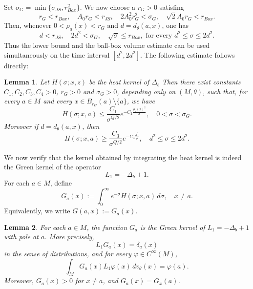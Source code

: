 \documentclass[11pt]{article}
\numberwithin{equation}{section}
\newtheorem{lemma}{Lemma}[section]
\numberwithin{equation}{section}
\begin{document}
	Set \(\sigma_G = \min\{\sigma_{JS}, r_{Box}^2\}\). We now choose a \(r_G > 0\) satisfing
	\[
	r_G < r_{Box}, \quad A_0 r_G < r_{JS}, \quad 2A_0^2 r_G^2 < \sigma_{G}, \quad \sqrt{2} A_0 r_G < r_{Box}.
	\]
	Then, whenever \(0<\rho_a(x)<r_G\) and \(d = d_\theta(a, x)\), one has
	\[
	d < r_{JS}, \quad 2d^2 <\sigma_{G}, \quad \sqrt{\sigma} \le r_{Box}, \text{ for every } d^2 \leq \sigma \leq 2d^2.
	\]
	Thus the lower bound and the ball-box volume estimate can be used simultaneously on the time interval \([d^2, 2d^2]\). The following estimate follows directly:
	\begin{lemma}\label{lemheatjl}
		Let \(H(\sigma ; x, z)\) be the heat kernel of \(\Delta_b\)  Then there exist constants \(C_1, C_2, C_3, C_4>0\), \(r_{G}>0\) and \(\sigma_{G}>0\), depending only on \((M, \theta)\), such that, for every \(a \in M\) and every \(x \in B_{r_G}(a) \setminus \{a\}\), we have
		\[
		H(\sigma ; x, a) \leq \frac{C_1}{\sigma^{Q/2}} e^{-C_2 \frac{\rho_a(x)^2}{\sigma}}, \quad 0<\sigma<\sigma_{G}.
		\]
		Moreover if \(d= d_\theta(a, x)\), then
		\[
		H(\sigma ; x, a) \ge \frac{C_3}{\sigma^{Q/2}} e^{-C_4 \frac{d^2}{\sigma}}, \quad d^2 \leq \sigma \leq 2d^2.
		\]
	\end{lemma}
	We now verify that the kernel obtained by integrating the heat kernel is indeed the Green kernel of the operator
	\[
	L_1=-\Delta_b+1.
	\]
	For each \(a\in M\), define
	\[
	G_a(x) := \int_0^\infty e^{-\sigma}H(\sigma;x,a)\,d\sigma, \quad x\ne a.
	\]
	Equivalently, we write \(G(a,x):=G_a(x)\).
	\begin{lemma}\label{lemgreen}
		For each \(a\in M\), the function \(G_a\) is the Green kernel of \(L_1=-\Delta_b+1\) with pole at \(a\).  More precisely,
		\[
		L_{1}G_a(x)=\delta_a(x)
		\]
		in the sense of distributions, and for every \(\varphi\in C^\infty(M)\),
		\[
		\int_M G_a(x)L_1\varphi(x)\,dv_\theta(x)=\varphi(a).
		\]
		Moreover, \(G_a(x)>0\) for \(x\ne a\), and \(G_a(x)=G_x(a)\).
	\end{lemma}
\end{document}
